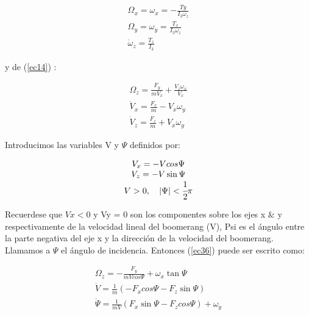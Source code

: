 		\begin{equation}
		\begin{matrix}
		\Omega_{x}={\omega}_{x}=-\frac{{T}{y}}{{I}_{3}{\omega}_{z}}\\
		\Omega_{y}={\omega}_{y}=\frac{{T}_{x}}{{I}_{3}{\omega}_{z}}\\
		\dot{\omega}_{z}=\frac{{T}_{z}}{{I}_{3}}
		\end{matrix}
		\label{ec35}
		\end{equation}

	y de (\ref{ec14}) :

		\begin{equation}
		\begin{matrix}
		\Omega_{z}=\frac{{F}_{y}}{m{V}_{x}}+\frac{{V}_{z}{\omega}_{x}}{{V}_{x}}\\
		\dot{V}_{x}=\frac{{F}_{x}}{m}-{V}_{x}{\omega}_{y}\\
		\dot{V}_{z}=\frac{{F}_{z}}{m}+{V}_{x}{\omega}_{y}
		\end{matrix}
		\label{ec36}
		\end{equation}


	Introducimos las variables V y $\Psi$  definidos por:

		\begin{equation}
		\begin{matrix}
		V_{x}=-Vcos{\Psi}\\
		V_{z}=-V\sin{\Psi}\\
		V>0,\quad\left|\Psi\right|<\cfrac{1}{2}\pi
		\end{matrix}
		\label{ec37}
		\end{equation}

	Recuerdese que $Vx<0$ y Vy = 0  son los componentes sobre los ejes x $\&$ y respectivamente de la velocidad lineal del boomerang (V), Psi es el ángulo entre la parte negativa del eje x y la dirección de la velocidad del boomerang. Llamamos a $\Psi$ el ángulo de incidencia. Entonces (\ref{ec36}) puede ser escrito como:

		\begin{equation}
		\begin{matrix}
		\Omega_{z}=-\frac{{F}_{y}}{mVcos{\Psi}}+{\omega}_{x}\tan{\Psi}\\
		\dot{V}=\frac{1}{m}(-{F}_{x}cos{\Psi}-{F}_{z}\sin{\Psi})\\
		\dot{\Psi}=\frac{1}{mV}({F}_{x}\sin{\Psi-{F}_{z}cos{\Psi}})+{\omega}_{y}
		\end{matrix}
		\label{ec38}
		\end{equation}

